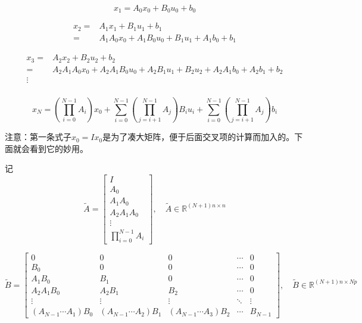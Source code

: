 \documentclass[withoutpreface,bwprint]{NoteBook}
\begin{document}
\begin{equation}
\label{eq:x_1}
x_{1} = A_0 x_0 + B_0 u_0 + b_0 
\end{equation}

\begin{align}
\label{eq:x_2}
x_{2} =& A_{1} x_{1} + B_{1} u_{1} + b_{1} \nonumber \\
=& A_{1} A_0 x_0 + A_{1} B_0 u_0 + B_{1} u_{1} + A_{1}b_0 + b_{1} 
\end{align}

\begin{align}
\label{eq:x_3}
x_{3} =& A_{2} x_{2} + B_{2} u_{2} + b_{2} \nonumber \\
=& A_{2} A_{1} A_0 x_0 + A_{2} A_{1} B_0 u_0 + A_{2} B_{1} u_{1} +B_{2} u_{2} + A_{2}A_{1}b_0 + A_{2} b_{1}+ b_{2} \\
\vdots & \nonumber \\
\end{align}

\begin{equation}
\label{eq:x_N}
x_{N} = \left(\prod_{i=0}^{N-1} A_i \right) x_0 + \sum_{i=0}^{N-1} \left(\prod_{j=i+1}^{N-1} A_j \right) B_i u_i + \sum_{i=0}^{N-1} \left(\prod_{j=i+1}^{N-1} A_j \right) b_i

\end{equation}

注意：第一条式子$x_0 = I x_0$是为了凑大矩阵，便于后面交叉项的计算而加入的。下面就会看到它的妙用。

记
\begin{equation}
\label{eq:big_A_define}
\tilde{A} = \begin{bmatrix}
I \\ A_0 \\ A_1 A_0 \\ A_2 A_1 A_0 \\ \vdots \\ \prod_{i=0}^{N-1} A_i
\end{bmatrix} 
,\quad  \tilde{A} \in \mathbb{R}^{(N+1) n \times n}
\end{equation}

\begin{equation}
\label{eq:big_B_define}
\tilde{B} =  \begin{bmatrix}
0 & 0 & 0 & \cdots & 0 \\
B_0 & 0 & 0 & \cdots & 0 \\
A_1 B_0 & B_1 & 0 & \cdots & 0 \\
A_2 A_1 B_0 & A_2 B_1 & B_2 & \cdots & 0 \\
\vdots & \vdots & \vdots & \ddots & \vdots \\
(A_{N-1}\cdots A_1)B_0 & (A_{N-1}\cdots A_2)B_1 & (A_{N-1}\cdots A_3)B_2 & \cdots & B_{N-1} 
\end{bmatrix} 
,\quad  \tilde{B} \in \mathbb{R}^{(N+1) n \times Np}
\end{equation}
\end{document}
